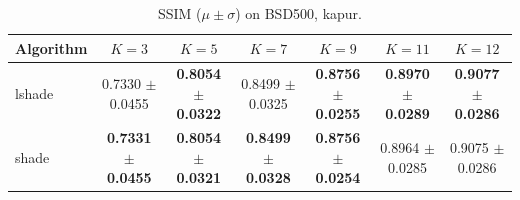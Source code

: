 \begin{table}[htbp]
\centering
\caption{SSIM ($\mu \pm \sigma$) on BSD500, kapur.}
\label{tab:exp1-kapur-ssim}
\begin{tabular}{lcccccc}
\toprule
Algorithm & $K=3$ & $K=5$ & $K=7$ & $K=9$ & $K=11$ & $K=12$ \\
\midrule
lshade & 0.7330 $\pm$ 0.0455 & \textbf{0.8054 $\pm$ 0.0322} & 0.8499 $\pm$ 0.0325 & \textbf{0.8756 $\pm$ 0.0255} & \textbf{0.8970 $\pm$ 0.0289} & \textbf{0.9077 $\pm$ 0.0286} \\
shade & \textbf{0.7331 $\pm$ 0.0455} & \textbf{0.8054 $\pm$ 0.0321} & \textbf{0.8499 $\pm$ 0.0328} & \textbf{0.8756 $\pm$ 0.0254} & 0.8964 $\pm$ 0.0285 & 0.9075 $\pm$ 0.0286 \\
\bottomrule
\end{tabular}
\end{table}